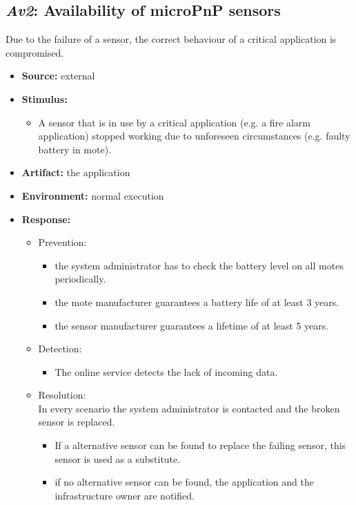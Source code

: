 \documentclass[english]{sareport}
\begin{document}
\subsection{\emph{Av2}: Availability of microPnP sensors}
Due to the failure of a sensor, the correct behaviour of a critical application is compromised.
\begin{itemize}
    \item \textbf{Source:} external
    \item \textbf{Stimulus:}
        \begin{itemize}
            \item A sensor that is in use by a critical application (e.g. a fire alarm application) stopped working due to unforeseen circumstances (e.g. faulty battery in mote).
        \end{itemize}

    \item \textbf{Artifact:} the application
    \item \textbf{Environment:} normal execution
    \item \textbf{Response:}
        \begin{itemize}
            \item Prevention:
            \begin{itemize}
            	\item the system administrator has to check the battery level on all motes periodically.
            	\item the mote manufacturer guarantees a battery life of at least 3 years.
            	\item the sensor manufacturer guarantees a lifetime of at least 5 years.
            \end{itemize}
            \item Detection:
            \begin{itemize}
            	\item The online service detects the lack of incoming data.
            \end{itemize}
            \item Resolution:\\
            In every scenario the system administrator is contacted and the broken sensor is replaced.
            \begin{itemize}
            	\item If a alternative sensor can be found to replace the failing sensor, this sensor is used as a substitute.
            	\item if no alternative sensor can be found, the application and the infrastructure owner are notified.
            \end{itemize}
        \end{itemize}


\end{itemize}
\end{document}
